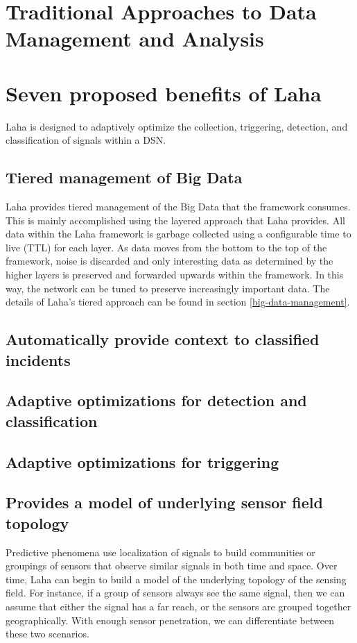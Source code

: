 \section{Traditional Approaches to Data Management and Analysis}

\section{Seven proposed benefits of Laha} \label{laha-benefits}
Laha is designed to adaptively optimize the collection, triggering, detection, and classification of signals within a DSN.

\subsection{Tiered management of Big Data}
Laha provides tiered management of the Big Data that the framework consumes. This is mainly accomplished using the layered approach that Laha provides. All data within the Laha framework is garbage collected using a configurable time to live (TTL) for each layer. As data moves from the bottom to the top of the framework, noise is discarded and only interesting data as determined by the higher layers is preserved and forwarded upwards within the framework. In this way, the network can be tuned to preserve increasingly important data. The details of Laha's tiered approach can be found in section \ref{big-data-management}.

\subsection{Automatically provide context to classified incidents}


\subsection{Adaptive optimizations for detection and classification}


\subsection{Adaptive optimizations for triggering}


\subsection{Provides a model of underlying sensor field topology}
Predictive phenomena use localization of signals to build communities or groupings of sensors that observe similar signals in both time and space. Over time, Laha can begin to build a model of the underlying topology of the sensing field. For instance, if a group of sensors always see the same signal, then we can assume that either the signal has a far reach, or the sensors are grouped together geographically. With enough sensor penetration, we can differentiate between these two scenarios.

